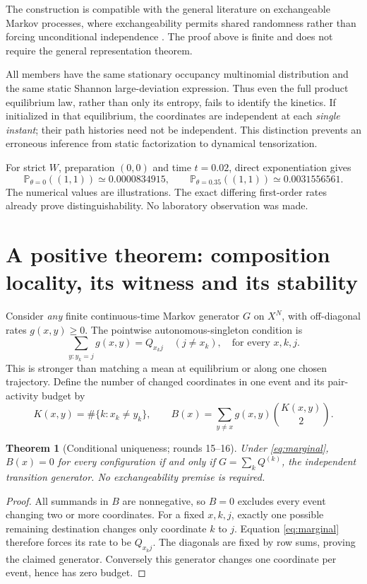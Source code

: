 \documentclass[11pt,a4paper]{article}
\newtheorem{theorem}{Theorem}
\newcommand{\Prob}{\mathbb P}
\begin{document}
The construction is compatible with the general literature on exchangeable
Markov processes, where exchangeability permits shared randomness rather
than forcing unconditional independence \cite{crane}. The proof above is
finite and does not require the general representation theorem.

All members have the same stationary occupancy multinomial distribution
and the same static Shannon large-deviation expression. Thus even the full
product equilibrium law, rather than only its entropy, fails to identify
the kinetics. If initialized in that equilibrium, the coordinates are
independent at each \emph{single instant}; their path histories need not be
independent. This distinction prevents an erroneous inference from static
factorization to dynamical tensorization.

For strict $W$, preparation $(0,0)$ and time $t=0.02$, direct exponentiation
gives
\[
 \Prob_{\theta=0}((1,1))\simeq0.0000834915,\qquad
 \Prob_{\theta=0.35}((1,1))\simeq0.0031556561.
\]
The numerical values are illustrations. The exact differing first-order
rates already prove distinguishability. No laboratory observation was made.

\section{A positive theorem: composition locality, its witness and its stability}
\label{sec:budget}

Consider \emph{any} finite continuous-time Markov generator $G$ on $X^N$,
with off-diagonal rates $g(x,y)\ge0$. The pointwise autonomous-singleton
condition is
\begin{equation}\label{eq:marginal}
 \sum_{y:y_k=j}g(x,y)=Q_{x_kj}\quad
 (j\ne x_k),\quad\text{for every }x,k,j.
\end{equation}
This is stronger than matching a mean at equilibrium or along one chosen
trajectory. Define the number of changed coordinates in one event and its
pair-activity budget by
\[
 K(x,y)=\#\{k:x_k\ne y_k\},\qquad
 B(x)=\sum_{y\ne x}g(x,y)\binom{K(x,y)}2.
\]

\begin{theorem}[Conditional uniqueness; rounds 15--16]
Under \eqref{eq:marginal}, $B(x)=0$ for every configuration if and only if
$G=\sum_k Q^{(k)}$, the independent transition generator.
No exchangeability premise is required.
\end{theorem}
\begin{proof}
All summands in $B$ are nonnegative, so $B=0$ excludes every event changing
two or more coordinates. For a fixed $x,k,j$, exactly one possible remaining
destination changes only coordinate $k$ to $j$. Equation \eqref{eq:marginal}
therefore forces its rate to be $Q_{x_kj}$. The diagonals are fixed by row
sums, proving the claimed generator. Conversely this generator changes one
coordinate per event, hence has zero budget.
\end{proof}
\end{document}
